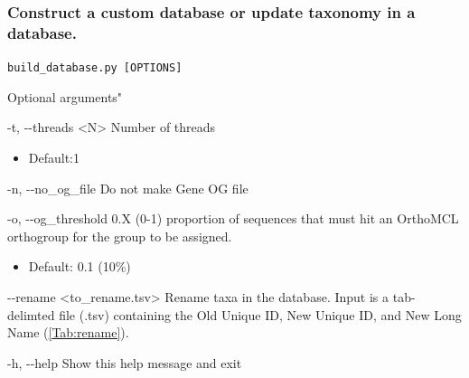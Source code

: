 \documentclass{article}
\def\code#1{\texttt{#1}}
\begin{document}
        \subsubsection{Construct a custom database or update taxonomy in a database.}
        \label{sec:builddb}
        \begin{description}
        
        
            \vspace{0.2cm}
            \item \code{build\_database.py [OPTIONS]}
            \vspace{0.2cm}
            
            \begin{description}
                \item Optional arguments"
                \begin{description}
                    \item -t, -\/-threads \hspace{0.2cm} <N> \hspace{0.2cm} Number of threads
                    \begin{itemize}
                        \item Default:1
                    \end{itemize}
                    \item -n, -\/-no\_og\_file \hspace{0.2cm} Do not make Gene OG file
                    \item -o, -\/-og\_threshold \hspace{0.2cm} 0.X (0-1) proportion of sequences that must hit an OrthoMCL orthogroup for the group to be assigned.
                    \begin{itemize}
                        \item Default: 0.1 (10\%)
                    \end{itemize}
                    \item -\/-rename \hspace{0.2cm} <to\_rename.tsv> \hspace{0.2cm} Rename taxa in the database. Input is a tab-delimted file (.tsv) containing the Old Unique ID, New Unique ID, and New Long Name (\autoref{Tab:rename}).
                    \item -h, -\/-help \hspace{0.2cm} Show this help message and exit
                \end{description}

\end{description}
\end{description}
\end{document}
